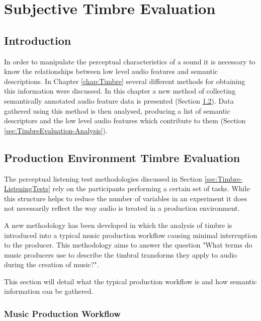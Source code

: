 \chapter{Subjective Timbre Evaluation}
\label{chap:TimbreEvaluation}

\section{Introduction}
\label{sec:TimbreEvaluation-Introduction}
	In order to manipulate the perceptual characteristics of a sound it is necessary to know the relationships between
	low level audio features and semantic descriptions. In Chapter \ref{chap:Timbre} several different methods for
	obtaining this information were discussed.  In this chapter a new method of collecting semantically annotated audio
	feature data is presented (Section \ref{sec:TimbreEvaluation-DAWBasedTimbreEvaluation}). Data gathered using this
	method is then analysed, producing a list of semantic descriptors and the low level audio features which contribute
	to them (Section \ref{sec:TimbreEvaluation-Analysis}).

\section{Production Environment Timbre Evaluation} %
\label{sec:TimbreEvaluation-DAWBasedTimbreEvaluation}
	The perceptual listening test methodologies discussed in Section \ref{sec:Timbre-ListeningTests} rely on the
	participants performing a certain set of tasks. While this structure helps to reduce the number of variables in an
	experiment it does not necessarily reflect the way audio is treated in a production environment.

	A new methodology has been developed in which the analysis of timbre is introduced into a typical music production
	workflow causing minimal interruption to the producer. This methodology aims to answer the question "What terms do
	music producers use to describe the timbral transforms they apply to audio during the creation of music?". 

	This section will detail what the typical production workflow is and how semantic information can be gathered.

	\subsection{Music Production Workflow}
	\label{sec:TimbreEvaluation-DAWBasedTimbreEvaluation-Workflow}


